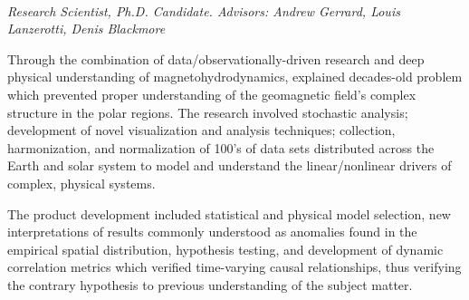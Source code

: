 \vspace{0.2cm}

 \\  
\vspace{-0.8em}
\textit{Research Scientist, Ph.D. Candidate. Advisors: Andrew Gerrard,
Louis Lanzerotti, Denis Blackmore} 
\begin{itemize*}
  \item 
    Through the combination of data/observationally-driven research and deep
    physical understanding of magnetohydrodynamics, explained
    decades-old problem which prevented proper understanding of the geomagnetic field's
    complex structure in the polar regions. The research involved
    stochastic analysis; development of novel visualization and
    analysis techniques; collection, harmonization, and normalization of
    100's of data sets distributed across the Earth and solar system
    to model and understand the linear/nonlinear drivers of complex,
    physical systems.
  \item The product development included statistical and physical model
    selection, new interpretations of results commonly understood as
    anomalies found in the empirical spatial distribution, hypothesis
    testing, and development of dynamic correlation metrics which verified 
    time-varying causal relationships, thus verifying the 
    contrary hypothesis to previous understanding of the subject matter.
\end{itemize*}


